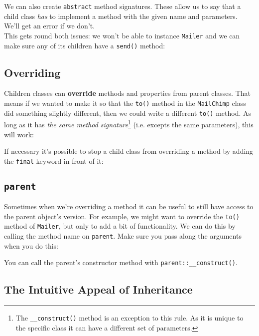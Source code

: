 We can also create \texttt{abstract} method signatures. These allow us to say that a child class \textit{has} to implement a method with the given name and parameters. We'll get an error if we don't.
\\

This gets round both issues: we won't be able to instance \texttt{Mailer} and we can make sure any of its children have a \texttt{send()} method:



\subsection{Overriding}

Children classes can \textbf{override} methods and properties from parent classes. That means if we wanted to make it so that the \texttt{to()} method in the \texttt{MailChimp} class did something slightly different, then we could write a different \texttt{to()} method. As long as it has \textit{the same method signature}\footnote{The \texttt{\_\_construct()} method is an exception to this rule. As it is unique to the specific class it can have a different set of parameters.} (i.e. excepts the same parameters), this will work:


If necessary it's possible to stop a child class from overriding a method by adding the \texttt{final} keyword in front of it:


\subsection{\texttt{parent}}

Sometimes when we're overriding a method it can be useful to still have access to the parent object's version. For example, we might want to override the \texttt{to()} method of \texttt{Mailer}, but only to add a bit of functionality. We can do this by calling the method name on \texttt{parent}. Make sure you pass along the arguments when you do this:


You can call the parent's constructor method with \texttt{parent::\_\_construct()}.


\subsection{The Intuitive Appeal of Inheritance}

